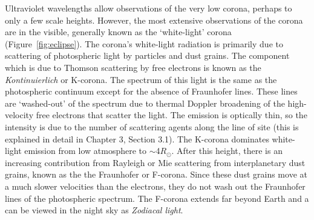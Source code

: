 Ultraviolet wavelengths allow observations of the very low corona, perhaps to only a few scale heights. However, the most extensive observations of the corona are in the visible, generally known as the `white-light' corona (Figure~\ref{fig:eclipse}). The corona's white-light radiation is primarily due to scattering of photospheric light by particles and dust grains. The component which is due to Thomson scattering by free electrons is known as the {\it Kontinuierlich} or K-corona. The spectrum of this light is the same as the photospheric continuum except for the absence of Fraunhofer lines. These lines are `washed-out' of the spectrum due to thermal Doppler broadening of the high-velocity free electrons that scatter the light. The emission is optically thin, so the intensity is due to the number of scattering agents along the line of site (this is explained in detail in Chapter 3, Section 3.1). The K-corona dominates white-light emission from low atmosphere to $\sim$4$R_{\odot}$. After this height, there is an increasing contribution from Rayleigh or Mie scattering from interplanetary dust grains, known as the the Fraunhofer or F-corona. Since these dust grains move at a much slower velocities than the electrons, they do not wash out the Fraunhofer lines of the photospheric spectrum. The F-corona extends far beyond Earth and a can be viewed in the night sky as {\it Zodiacal light}.

